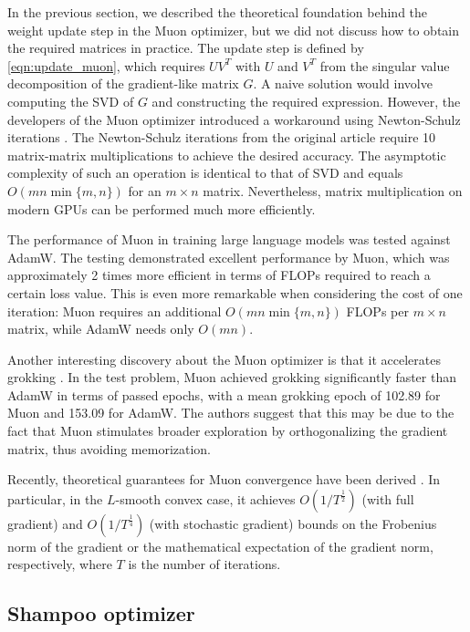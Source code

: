 \documentclass[]{scrartcl}
\begin{document}
In the previous section, we described the theoretical foundation behind the weight update step in the Muon optimizer, but we did not discuss how to obtain the required matrices in practice. The update step is defined by \eqref{eqn:update_muon}, which requires $UV^T$ with $U$ and $V^T$ from the singular value decomposition of the gradient-like matrix $G$. A naive solution would involve computing the SVD of $G$ and constructing the required expression. However, the developers of the Muon optimizer introduced a workaround using Newton-Schulz iterations \cite{jordan2024muon}. The Newton-Schulz iterations from the original article \cite{jordan2024muon} require 10 matrix-matrix multiplications to achieve the desired accuracy. The asymptotic complexity of such an operation is identical to that of SVD and equals $O(mn \min\{m, n\})$ for an $m \times n$ matrix. Nevertheless, matrix multiplication on modern GPUs can be performed much more efficiently.

The performance of Muon in training large language models was tested \cite{liu2025muon} against AdamW. The testing demonstrated excellent performance by Muon, which was approximately 2 times more efficient in terms of FLOPs required to reach a certain loss value. This is even more remarkable when considering the cost of one iteration: Muon requires an additional $O(mn \min\{m, n\})$ FLOPs per $m \times n$ matrix, while AdamW needs only $O(mn)$.

Another interesting discovery about the Muon optimizer is that it accelerates grokking \cite{tveit2025muonoptimizeracceleratesgrokking}. In the test problem, Muon achieved grokking significantly faster than AdamW in terms of passed epochs, with a mean grokking epoch of 102.89 for Muon and 153.09 for AdamW. The authors suggest that this may be due to the fact that Muon stimulates broader exploration by orthogonalizing the gradient matrix, thus avoiding memorization.

Recently, theoretical guarantees for Muon convergence have been derived \cite{li2025noteconvergencemuon}. In particular, in the $L$-smooth convex case, it achieves $O(1/T^{\frac{1}{2}})$ (with full gradient) and $O(1/T^{\frac{1}{4}})$ (with stochastic gradient) bounds on the Frobenius norm of the gradient or the mathematical expectation of the gradient norm, respectively, where $T$ is the number of iterations.

\subsection{Shampoo optimizer}
\end{document}
